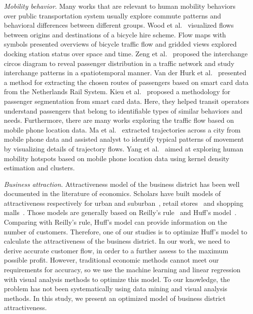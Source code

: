 \documentclass[journal]{IEEEtran}
\begin{document}
\emph{Mobility behavior}. Many works that are relevant to human mobility behaviors over public transportation system usually explore commute patterns and behavioral differences between different groups.  Wood et al.~\cite{Wood2011Visualizing} visualized flows between origins and destinations of a bicycle hire scheme. Flow maps with symbols presented overviews of bicycle traffic flow and gridded views explored docking station status over space and time. Zeng et al.~\cite{Zeng2013Visualizing} proposed the interchange circos diagram to reveal passenger distribution in a traffic network and study interchange patterns in a spatiotemporal manner.  Van der Hurk et al.~\cite{Hurk2015Deduction} presented a method for extracting the chosen routes of passengers based on smart card data from the Netherlands Rail System. Kieu et al.~\cite{Le2015Passenger} proposed a methodology for passenger segmentation from smart card data. Here, they helped transit operators understand passengers that belong to identifiable types of similar behaviors and needs.  
Furthermore, there are many works exploring the traffic flow based on mobile phone location data. Ma et al.~\cite{Ma2016Mobility} extracted trajectories across a city from mobile phone data and assisted analyst to identify typical patterns of movement by visualizing details of trajectory flows. Yang et al.~\cite{Yang2016Exploring} aimed at exploring human mobility hotspots based on mobile phone location data using kernel density estimation and clusters.

\emph{Business attraction}. Attractiveness model of the business district has been well documented in the literature of economics. Scholars have built models of attractiveness respectively for urban and suburban~\cite{Dennis2002Central,Wahlberg2016Small}, retail stores~\cite{Singla2016Investigating} and shopping malls~\cite{Dennis2002Central,Yao2016Factor}. Those models are generally based on Reilly’s rule~\cite{Reilly2006Reilly} and Huff's model~\cite{Honda1982QUANTITATIVE}. Comparing with Reilly’s rule, Huff's model can provide information on the number of customers. Therefore, one of our studies is to optimize Huff's model to calculate the attractiveness of the business district. In our work, we need to derive accurate customer flow, in order to a further assess to the maximum possible profit. However, traditional economic methods cannot meet our requirements for accuracy, so we use the machine learning and linear regression with visual analysis methods to optimize this model. To our knowledge, the problem has not been systematically using data mining and visual analysis methods. In this study, we present an optimized model of business district attractiveness. 
\end{document}
